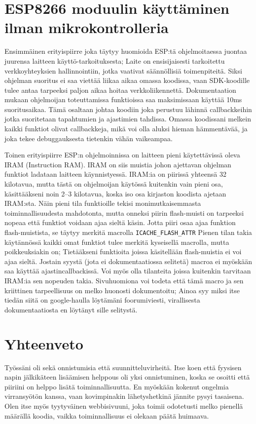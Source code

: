 \section{ESP8266 moduulin käyttäminen ilman mikrokontrolleria}
\label{sec:extra}

Ensimmäinen erityispiirre joka täytyy huomioida ESP:tä ohjelmoitaessa juontaa
juurensa laitteen käyttö-tarkoituksesta; Laite on ensisijaisesti tarkoitettu
verkkoyhteyksien hallinnointiin, jotka vaativat säännöllisiä toimenpiteitä.
Siksi ohjelman suoritus ei saa viettää liikaa aikaa omassa koodissa, vaan
SDK-koodille tulee antaa tarpeeksi paljon aikaa hoitaa verkkoliikennettä.
Dokumentaation mukaan ohjelmoijan toteuttamissa funktioissa saa maksimissaan
käyttää 10ms suoritusaikaa. Tämä osaltaan johtaa koodiin joka perustuu lähinnä
callbackkeihin jotka suoritetaan tapahtumien ja ajastimien tahdissa. Omassa
koodissani melkein kaikki funktiot olivat callbackkeja, mikä voi olla aluksi
hieman hämmentävää, ja joka tekee debuggauksesta tietenkin vähän vaikeampaa.

Toinen erityispiirre ESP:n ohjelmoinnissa on laitteen pieni käytettävissä oleva
IRAM (Instruction RAM). IRAM on siis muistia johon ajettavan ohjelman funktiot
ladataan laitteen käynnistyessä. IRAM:ia on piirissä yhteensä 32 kilotavua,
mutta tästä on ohjelmoijan käytössä kuitenkin vain pieni osa, käsittääkseni
noin 2--3 kilotavua, koska iso osa kirjaston koodista ajetaan IRAM:sta. Näin
pieni tila funktioille tekisi monimutkaisemmasta toiminnallisuudesta
mahdotonta, mutta onneksi piirin flash-muisti on tarpeeksi nopeaa että funktiot
voidaan ajaa sieltä käsin. Jotta piiri osaa ajaa funktion flash-muistista, se
täytyy merkitä macrolla \texttt{ICACHE\_FLASH\_ATTR} Pienen tilan takia
käytännössä kaikki omat funktiot tulee merkitä kyseisellä macrolla, mutta
poikkeuksiakin on; Tietääkseni funktioita joissa käsitellään flash-muistia ei
voi ajaa sieltä.  Jostain syystä (jota ei dokumentaatiossa selitetä) macroa ei
myöskään saa käyttää ajastincallbackissä.  Voi myös olla tilanteita joissa
kuitenkin tarvitaan IRAM:ia sen nopeuden takia.  Sivuhuomiona voi todeta että
tämä macro ja sen kriittinen tarpeellisuus on melko huonosti dokumentoitu;
Ainoa syy miksi itse tiedän siitä on google-haulla löytämäni foorumiviesti,
virallisesta dokumentaatiosta en löytänyt sille selitystä.

\section{Yhteenveto}
Työssäni oli sekä onnistumisia että suunnitteluvirheitä. Itse koen että
fyysisen napin jälkikäteen lisäämisen helppous oli yksi onnistuminen, koska se
osoitti että piiriini on helppo lisätä toiminnallisuutta. En myöskään kokenut
ongelmia virransyötön kanssa, vaan kovimpinakin lähetyshetkinä jännite pysyi
tasaisena. Olen itse myös tyytyväinen webbisivuuni, joka toimii odotetusti
melko pienellä määrällä koodia, vaikka toiminnallisuus ei olekaan päätä
huimaava.

